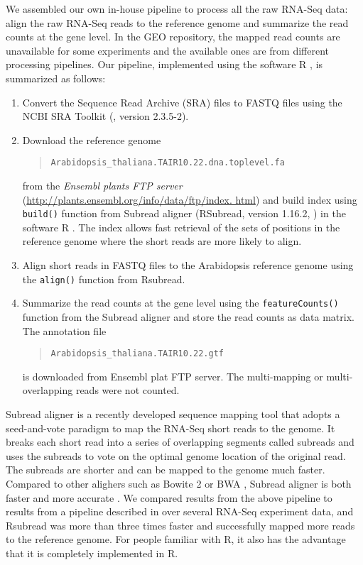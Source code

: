 	
	We assembled our own in-house pipeline to process all the raw RNA-Seq data:
	align the raw RNA-Seq reads to the reference genome and summarize the read counts at the 
	gene level. In the GEO repository, the
	mapped read counts are unavailable for some experiments and the available ones
	are from different processing pipelines.  
	Our pipeline, implemented using the software R \citep{Rpackage}, is summarized as follows: 
	\begin{enumerate}
		\item Convert the Sequence Read Archive (SRA) files to FASTQ files using the NCBI SRA Toolkit (\cite{leinonen2010sequence}, version 2.3.5-2).
		\item Download the reference genome 
		\begin{quote}
			\verb|Arabidopsis_thaliana.TAIR10.22.dna.toplevel.fa |
		\end{quote} 
		from the \textit{ Ensembl plants FTP server} (\url{http://plants.ensembl.org/info/data/ftp/index. html}) and build index using \verb|build()| function from 
		Subread aligner (RSubread, version 1.16.2, \citealt{liao2013subread}) in the software R
		\citep{ Rpackage}. The index allows fast retrieval of the sets of positions in the reference genome where the short reads are more likely to align. 
		\item Align short reads in FASTQ files to the Arabidopsis reference genome using the \verb|align()| function from Rsubread. 
		\item
		Summarize the read counts at the gene level using the \verb|featureCounts()| function from the
		Subread aligner
		and store the read counts as data matrix.  
		The annotation file 
		\begin{quote}
			\verb"Arabidopsis_thaliana.TAIR10.22.gtf" 
		\end{quote}
		is
		downloaded from Ensembl plat FTP server. The multi-mapping or
		multi-overlapping  reads were not counted.  
		
	\end{enumerate}
	Subread aligner is a recently developed sequence mapping tool that adopts a
	seed-and-vote paradigm to map the RNA-Seq short reads to the genome. 
	It breaks each short read into a series of overlapping segments called
	subreads and uses the subreads to vote on the optimal genome location of the
	original read. The subreads are shorter and can be mapped to the genome much
	faster.
	Compared to other alighers such as Bowite 2 \citep{langmead2012fast} or BWA
	\citep{li2009fast}, Subread aligner is both faster and more accurate
	\citep{liao2013subread}. We compared results from the above
	pipeline to results from a pipeline described in \cite{anders2013count} over several RNA-Seq experiment data, and Rsubread
	was more than three times faster and successfully mapped more reads to the
	reference genome.  For people familiar with R, it also has the advantage
	that it is completely implemented in R.
	
